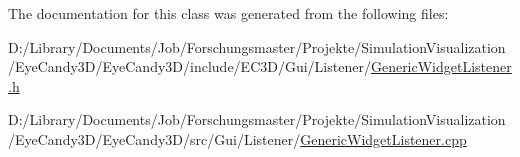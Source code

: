 The documentation for this class was generated from the following files\+:\begin{DoxyCompactItemize}
\item 
D\+:/\+Library/\+Documents/\+Job/\+Forschungsmaster/\+Projekte/\+Simulation\+Visualization/\+Eye\+Candy3\+D/\+Eye\+Candy3\+D/include/\+E\+C3\+D/\+Gui/\+Listener/\mbox{\hyperlink{_generic_widget_listener_8h}{Generic\+Widget\+Listener.\+h}}\item 
D\+:/\+Library/\+Documents/\+Job/\+Forschungsmaster/\+Projekte/\+Simulation\+Visualization/\+Eye\+Candy3\+D/\+Eye\+Candy3\+D/src/\+Gui/\+Listener/\mbox{\hyperlink{_generic_widget_listener_8cpp}{Generic\+Widget\+Listener.\+cpp}}\end{DoxyCompactItemize}
